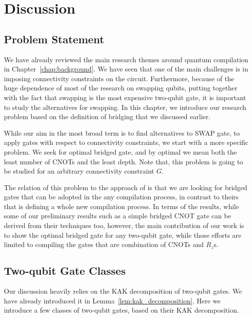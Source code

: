 \chapter{Discussion}\label{chap:discussion}

\section{Problem Statement}

We have already reviewed the main research themes around quantum compilation in Chapter~\ref{chap:background}. We have seen that one of the main challenges is in imposing connectivity constraints on the circuit. Furthermore, because of the huge dependence of most of the research on swapping qubits, putting together with the fact that swapping is the most expensive two-qubit gate, it is important to study the alternatives for swapping. In this chapter, we introduce our research problem based on the definition of bridging that we discussed earlier.

While our aim in the most broad term is to find alternatives to SWAP gate, to apply gates with respect to connectivity constraints, we start with a more specific problem. We seek for optimal bridged gate, and by optimal we mean both the least number of CNOTs and the least depth. Note that, this problem is going to be studied for an arbitrary connectivity constraint $G$.

The relation of this problem to the approach of \cite{nash2020,kissinger2019} is that we are looking for bridged gates that can be adopted in the any compilation process, in contrast to theirs that is defining a whole new compilation process. In terms of the results, while some of our preliminary results such as a simple bridged CNOT gate can be derived from their techniques too, however, the main contribution of our work is to show the optimal bridged gate for any two-qubit gate, while those efforts are limited to compiling the gates that are combination of CNOTs and $R_z$s.

\section{Two-qubit Gate Classes}

Our discussion heavily relies on the KAK decomposition of two-qubit gates. We have already introduced it in Lemma~\ref{lem:kak_decomposition}. Here we introduce a few classes of two-qubit gates, based on their KAK decomposition.

